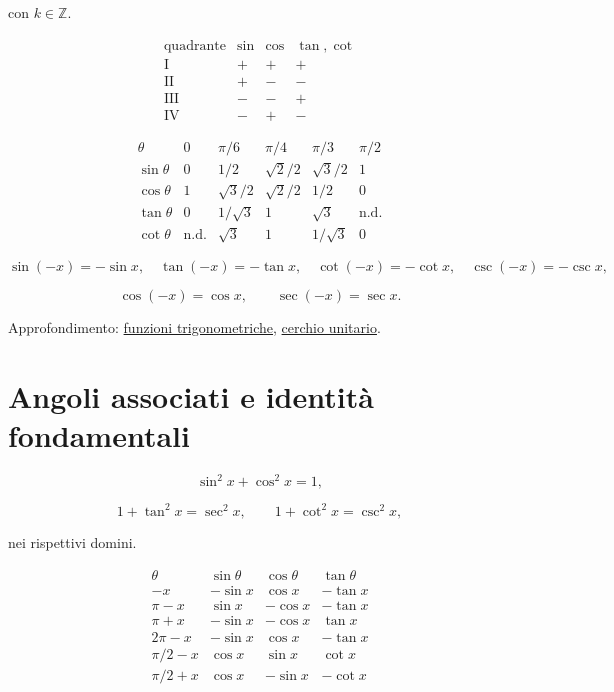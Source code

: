 con \(k\in\mathbb Z\).

\[
\begin{array}{c|ccc}
\text{quadrante}&\sin&\cos&\tan,\cot\\
\hline
\mathrm I&+&+&+\\
\mathrm{II}&+&-&-\\
\mathrm{III}&-&-&+\\
\mathrm{IV}&-&+&-
\end{array}
\]

\[
\begin{array}{c|ccccc}
\theta&0&\pi/6&\pi/4&\pi/3&\pi/2\\
\hline
\sin\theta&0&1/2&\sqrt2/2&\sqrt3/2&1\\
\cos\theta&1&\sqrt3/2&\sqrt2/2&1/2&0\\
\tan\theta&0&1/\sqrt3&1&\sqrt3&\text{n.d.}\\
\cot\theta&\text{n.d.}&\sqrt3&1&1/\sqrt3&0
\end{array}
\]

\[
\sin(-x)=-\sin x,
\quad
\tan(-x)=-\tan x,
\quad
\cot(-x)=-\cot x,
\quad
\csc(-x)=-\csc x,
\]

\[
\cos(-x)=\cos x,
\qquad
\sec(-x)=\sec x.
\]

Approfondimento: \href{https://ingegnerismo.it/matematica/funzioni-trigonometriche/}{funzioni trigonometriche}, \href{https://ingegnerismo.it/matematica/cerchio-unitario/}{cerchio unitario}.

\section{Angoli associati e identità fondamentali}\label{angoli-associati-e-identituxe0-fondamentali}

\[
\sin^2x+\cos^2x=1,
\]

\[
1+\tan^2x=\sec^2x,
\qquad
1+\cot^2x=\csc^2x,
\]

nei rispettivi domini.

\[
\begin{array}{c|ccc}
\theta&\sin\theta&\cos\theta&\tan\theta\\
\hline
-x&-\sin x&\cos x&-\tan x\\
\pi-x&\sin x&-\cos x&-\tan x\\
\pi+x&-\sin x&-\cos x&\tan x\\
2\pi-x&-\sin x&\cos x&-\tan x\\
\pi/2-x&\cos x&\sin x&\cot x\\
\pi/2+x&\cos x&-\sin x&-\cot x
\end{array}
\]


